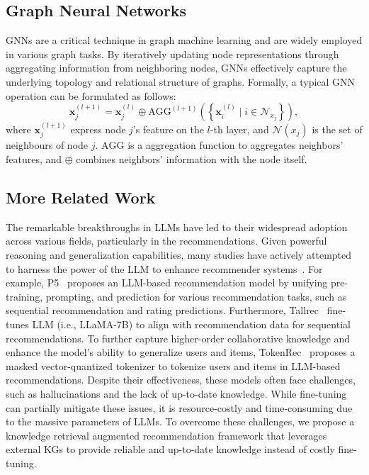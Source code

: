 \subsection{Graph Neural Networks}\label{appendix:gnn}
GNNs are a critical technique in graph machine learning and are widely employed in various graph tasks. 
By iteratively updating node representations through aggregating information from neighboring nodes, GNNs effectively capture the underlying topology and relational structure of graphs.
Formally, a typical GNN operation can be formulated as follows:
\begin{equation}
\mathbf{x}_j^{(l+1)}=\mathbf{x}_j^{(l)} \oplus \mathrm{AGG}^{(l+1)}\left(\left\{\mathbf{x}_i^{(l)} \mid i \in \mathcal{N}_{x_j}\right\}\right),
\end{equation}
where $\mathbf{x}_j^{(l+1)}$ express node $j$'s feature on the $l$-th layer, and $\mathcal{N}(x_j)$ is the set of neighbours of node $j$. $\mathrm{AGG}$ is a aggregation function to aggregates
neighbors’ features, and $\oplus$ combines neighbors' information with the node itself.







\subsection{More Related Work}\label{appendix:related_work}
The remarkable breakthroughs in LLMs have led to their widespread adoption across various fields, particularly in the recommendations. 
Given powerful reasoning and generalization capabilities, many studies have actively attempted to harness the power of the LLM to enhance recommender systems~\citep{geng2022recommendation,bao2023tallrec,qu2024tokenrec,wei2024llmrec,zhang2023collm}. For example, P5~\citep{geng2022recommendation} proposes an LLM-based recommendation model by unifying pre-training, prompting, and prediction for various recommendation tasks, such as sequential recommendation and rating predictions. Furthermore, Tallrec~\citep{bao2023tallrec} fine-tunes LLM (i.e., LLaMA-7B) to align with recommendation data for sequential recommendations.
To further capture higher-order collaborative knowledge and enhance the model's ability to generalize users and items, TokenRec~\citep{qu2024tokenrec} proposes a masked vector-quantized tokenizer to tokenize users and items in LLM-based recommendations.
Despite their effectiveness, these models often face challenges, such as hallucinations and the lack of up-to-date knowledge.
While fine-tuning can partially mitigate these issues, it is resource-costly and time-consuming due to the massive parameters of LLMs.
To overcome these challenges, we propose a knowledge retrieval augmented recommendation framework that leverages external KGs to provide reliable and up-to-date knowledge instead of costly fine-tuning.


